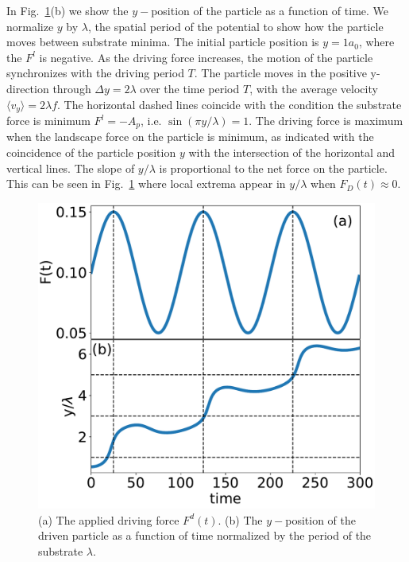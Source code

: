 \documentclass[twocolumn,preprintnumbers,amsmath,amssymb,aps,prx]{revtex4}
\begin{document}
In Fig.~\ref{fig:0}(b) 
we show the $y-$position of the particle
as a function of time.
We 
normalize $y$ by $\lambda$, the spatial period of the potential
to show how the particle moves between substrate minima.  
The initial particle position is $y = 1 a_0$,
where the $F^l$ is negative.
As the driving force increases,
the motion of the particle
synchronizes with the driving period $T$.
The particle moves
in the positive y-direction
through $\Delta y = 2 \lambda$ over the time period $T$,
with 
the average velocity 
$\langle {v}_y \rangle= 2 \lambda f$. %
The horizontal dashed lines
coincide with the condition the substrate force is
minimum $F^l = -A_p$,  
i.e. $\sin{(\pi y / \lambda)} = 1$.
The %
driving force is maximum when the landscape 
force on the particle is minimum,
as indicated with the coincidence of 
the particle position $y$
with the intersection of
the horizontal and vertical lines.
The slope of $y/\lambda$
is proportional to the net force on the particle.
This can be seen in 
Fig.~\ref{fig:0} %
where local extrema appear in $y/\lambda$
when $F_{D}(t) \approx 0 $. 


\begin{center}
\begin{figure}[h!]
\centering
\includegraphics[width=\columnwidth]{single_particle.pdf}
\caption{(a) The applied driving force $F^d(t)$. %
  (b) 
  The $y-$position of the driven particle
  as a function of time %
  normalized by the period of the substrate $\lambda$.
  }
\label{fig:0}
\end{figure}
\end{center}
\end{document}
